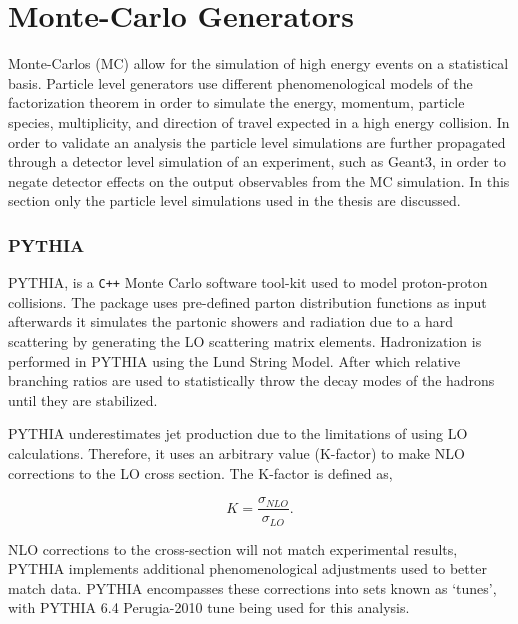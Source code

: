 \section{Monte-Carlo Generators}
Monte-Carlos (MC) allow for the simulation of high energy events on a statistical basis.  Particle level generators use different phenomenological models of the factorization theorem in order to simulate the energy, momentum, particle species, multiplicity, and direction of travel expected in a high energy collision.  In order to validate an analysis the particle level simulations are further propagated through a detector level simulation of an experiment, such as Geant3\cite{Brun:1119728}, in order to negate detector effects on the output observables from the MC simulation.  In this section only the particle level simulations used in the thesis are discussed.

\subsubsection{PYTHIA}

PYTHIA\cite{Sjostrand:2007gs}, is a \verb|C++| Monte Carlo software tool-kit used to model proton-proton collisions.  The package uses pre-defined parton distribution functions as input afterwards it simulates the partonic showers and radiation due to a hard scattering by generating the LO scattering matrix elements.  Hadronization is performed in PYTHIA using the Lund String Model.  After which relative branching ratios are used to statistically throw the decay modes of the hadrons until they are stabilized.

PYTHIA underestimates jet production due to the limitations of using LO calculations.  Therefore, it uses an arbitrary value (K-factor) to make NLO corrections to the LO cross section.  The K-factor is defined as,

\begin{equation}
K = \frac{\sigma_{NLO}}{\sigma_{LO}}.
\label{eq:Kfactor}
\end{equation}

NLO corrections to the cross-section will not match experimental results, PYTHIA implements additional phenomenological adjustments used to better match data.  PYTHIA encompasses these corrections into sets known as `tunes', with PYTHIA 6.4 Perugia-2010 tune being used for this analysis\cite{Skands:2010ak}.

